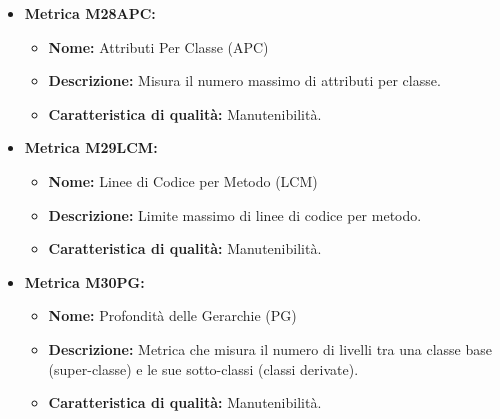 \begin{itemize}
        \item \hypertarget{item:M28APC}{\textbf{Metrica M28APC:}}
        \begin{minipage}[t]{0.9\textwidth}
          \begin{itemize}
              \item \textbf{Nome:} Attributi Per Classe (APC)
              \item \textbf{Descrizione:} Misura il numero massimo di attributi per classe.
              \item \textbf{Caratteristica di qualità:} Manutenibilità.
          \end{itemize} 
        \end{minipage}

          \item \hypertarget{item:M29LCM}{\textbf{Metrica M29LCM:}}
          \begin{minipage}[t]{0.9\textwidth}
          \begin{itemize}
              \item \textbf{Nome:} Linee di Codice per Metodo (LCM)
              \item \textbf{Descrizione:} Limite massimo di linee di codice per metodo.
              \item \textbf{Caratteristica di qualità:} Manutenibilità.
          \end{itemize}
         \end{minipage} 

          \item \hypertarget{item:M30PG}{\textbf{Metrica M30PG:}}
          \begin{minipage}[t]{0.9\textwidth}
            \begin{itemize}
              \item \textbf{Nome:} Profondità delle Gerarchie (PG)
              \item \textbf{Descrizione:} Metrica che misura il numero di livelli tra una classe base (super-classe) e le sue sotto-classi (classi derivate).
              \item \textbf{Caratteristica di qualità:} Manutenibilità.
           \end{itemize} 
          \end{minipage}


\end{itemize}
